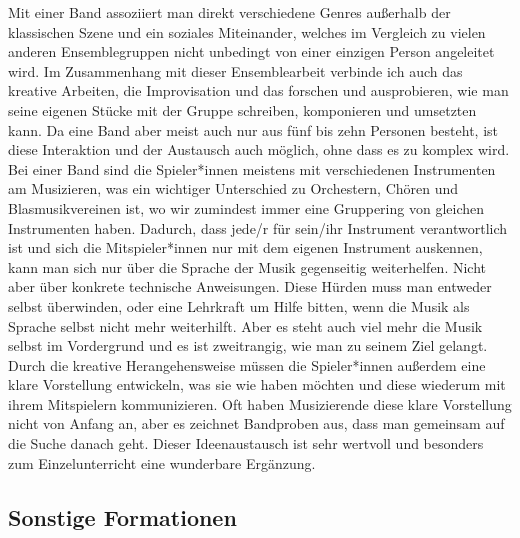 Mit einer Band assoziiert man direkt verschiedene Genres außerhalb der
klassischen Szene und ein soziales Miteinander, welches im Vergleich zu vielen
anderen Ensemblegruppen nicht unbedingt von einer einzigen Person angeleitet
wird. Im Zusammenhang mit dieser Ensemblearbeit verbinde ich auch das kreative
Arbeiten, die Improvisation und das forschen und ausprobieren, wie man seine
eigenen Stücke mit der Gruppe schreiben, komponieren und umsetzten kann. Da eine
Band aber meist auch nur aus fünf bis zehn Personen besteht, ist diese
Interaktion und der Austausch auch möglich, ohne dass es zu komplex wird. Bei
einer Band sind die Spieler*innen meistens mit verschiedenen Instrumenten am
Musizieren, was ein wichtiger Unterschied zu Orchestern, Chören und
Blasmusikvereinen ist, wo wir zumindest immer eine Gruppering von gleichen
Instrumenten haben. Dadurch, dass jede/r für sein/ihr Instrument verantwortlich
ist und sich die Mitspieler*innen nur mit dem eigenen Instrument auskennen, kann
man sich nur über die Sprache der Musik gegenseitig weiterhelfen. Nicht aber
über konkrete technische Anweisungen. Diese Hürden muss man entweder selbst
überwinden, oder eine Lehrkraft um Hilfe bitten, wenn die Musik als Sprache
selbst nicht mehr weiterhilft. Aber es steht auch viel mehr die Musik selbst im
Vordergrund und es ist zweitrangig, wie man zu seinem Ziel gelangt. Durch die
kreative Herangehensweise müssen die Spieler*innen außerdem eine klare
Vorstellung entwickeln, was sie wie haben möchten und diese wiederum mit ihrem
Mitspielern kommunizieren. Oft haben Musizierende diese klare Vorstellung nicht
von Anfang an, aber es zeichnet Bandproben aus, dass man gemeinsam auf die Suche
danach geht. Dieser Ideenaustausch ist sehr wertvoll und besonders zum
Einzelunterricht eine wunderbare Ergänzung.



\subsection{Sonstige Formationen}


